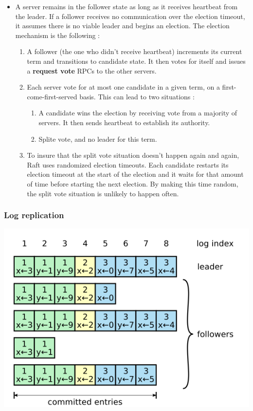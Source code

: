 \begin{itemize}

\item A server remains in the follower state as long as it receives heartbeat from the leader. If a follower receives no communication over the election timeout, it assumes there is no viable leader and begins an election. The election mechanism is the following :
\begin{enumerate}
\item A follower (the one who didn't receive heartbeat) increments its current term and transitions to candidate state. It then votes for itself and issues a \textbf{request vote} RPCs to the other servers.
\item Each server vote for at most one candidate in a given term, on a first-come-first-served basis. This can lead to two situations :
\begin{enumerate}
\item A candidate wins the election by receiving vote from a majority of servers. It then sends heartbeat to establish its authority.
\item Splite vote, and no leader for this term.
\end{enumerate}

\item To insure that the split vote situation doesn't happen again and again, Raft uses randomized election timeouts. Each candidate restarts its election timeout at the start of the election and it waits for that amount of time before starting the next election. By making this time random, the split vote situation is unlikely to happen often.
\end{enumerate}
\end{itemize}
\subsubsection{Log replication}

\begin{center}
\includegraphics[scale=0.5]{img/logs}
\end{center}

